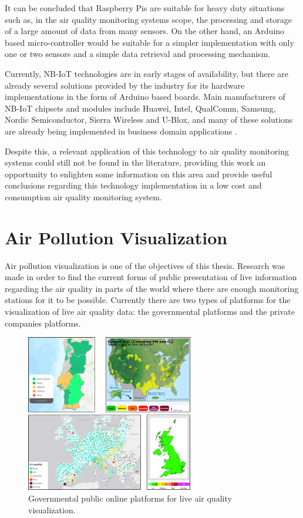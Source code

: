 It can be concluded that Raspberry Pis are suitable for heavy duty situations such as, in the air quality monitoring systems scope, the processing and storage of a large amount of data from many sensors. On the other hand, an Arduino based micro-controller would be suitable for a simpler implementation with only one or two sensors and a simple data retrieval and processing mechanism.

Currently, NB-IoT technologies are in early stages of availability, but there are already several solutions provided by the industry for its hardware implementations in the form of Arduino based boards. Main manufacturers of NB-IoT chipsets and modules include Huawei, Intel, QualComm, Samsung, Nordic Semiconductor, Sierra Wireless and U-Blox, and many of these solutions are already being implemented in business domain applications \cite{Yllasjarvi2018}.

Despite this, a relevant application of this technology to air quality monitoring systems could still not be found in the literature, providing this work an opportunity to enlighten some information on this area and provide useful conclusions regarding this technology implementation in a low cost and consumption air quality monitoring system.


\section{Air Pollution Visualization}

Air pollution visualization is one of the objectives of this thesis. Research was made in order to find the current forms of public presentation of live information regarding the air quality in parts of the world where there are enough monitoring stations for it to be possible.
Currently there are two types of platforms for the visualization of live air quality data: the governmental platforms and the private companies platforms.

\begin{figure}[ht]
\centering
\includegraphics[width=0.65\textwidth]{./Images/air-visualization.png}
\caption{Governmental public online platforms for live air quality visualization.}
\label{fig:air-visualization}
\end{figure}

